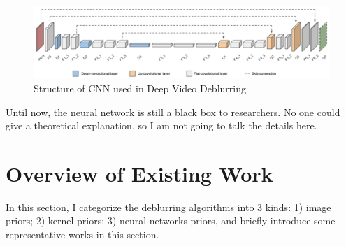 \documentclass[journal, onecolumn, 10pt]{IEEEtran}
\begin{document}
\begin{figure}[h!]
\centering
\includegraphics[width = 1\textwidth]{pic/deep_video_deblurring_cnn.png}
\caption{Structure of CNN used in Deep Video Deblurring\cite{su2016deep}}
\label{fig:deep_video_deblurring_cnn}
\end{figure}

Until now, the neural network is still a black box to researchers. No one could give a theoretical explanation, so I am not going to talk the details here.

\section{Overview of Existing Work}
\label{sec:overview_existing}
In this section, I categorize the deblurring algorithms into $3$ kinds: 1) image priors; 2) kernel priors; 3) neural networks priors, and briefly introduce some representative works in this section.
\end{document}
